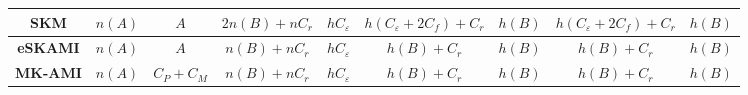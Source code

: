 \begin{table*}[htbp]
\begin{center}
{\begin{tabular}{|c|c|c|c|c|c|c|c|c|}
\textbf{SKM} \cite{Wan14}                      & $n(A)$                                         & $A$                                                           & $2n(B)+nC_r$                                                & $hC_\varepsilon$                                             & $h(C_\varepsilon+2C_f)+C_r$                                             & $h(B)$                                         & $h(C_\varepsilon+2C_f)+C_r$                                             & $h(B)$                                          \\ \hline
\textbf{eSKAMI} \cite{Benmalek15}                   & $n(A)$                                           & $A$                                                           & $n(B)+nC_r$                                              & $hC_\varepsilon$                                            &  $h(B)+C_r$                                               &  $h(B)$                                            &  $h(B)+C_r$                                               &  $h(B)$                                             \\ \hline
\textbf{MK-AMI} \cite{Benmalek2016}                   & $n(A)$                                           & $C_P+C_M$                                                            & $n(B)+nC_r$                                              & $hC_\varepsilon$                                             & $h(B)+C_r$                                             & $h(B)$                                          & $h(B)+C_r$                                             & $h(B)$                                          \\ \hline
\end{tabular}
}
\end{center}
\end{table*}


